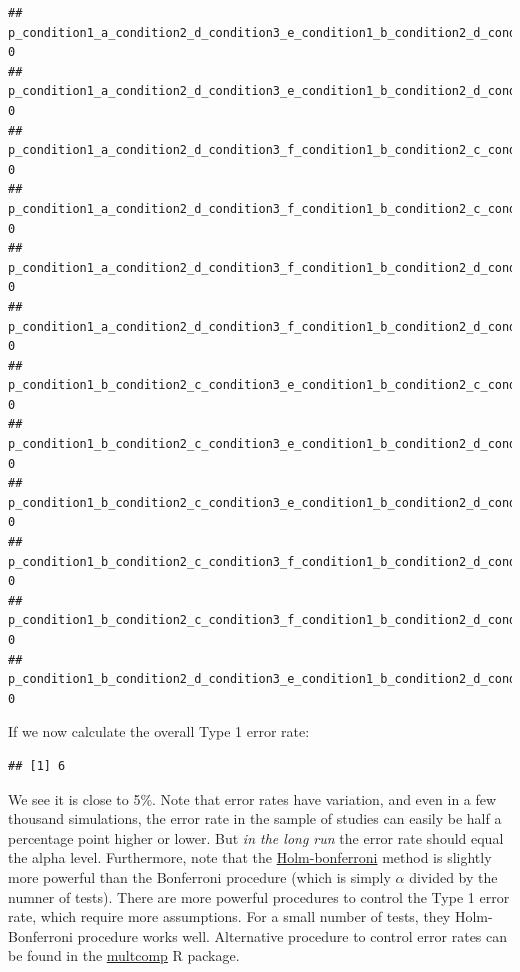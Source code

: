 \documentclass[]{book}
\newenvironment{Shaded}{\begin{snugshade}}{\end{snugshade}}
\newcommand{\ControlFlowTok}[1]{\textcolor[rgb]{0.13,0.29,0.53}{\textbf{#1}}}
\newcommand{\DecValTok}[1]{\textcolor[rgb]{0.00,0.00,0.81}{#1}}
\newcommand{\KeywordTok}[1]{\textcolor[rgb]{0.13,0.29,0.53}{\textbf{#1}}}
\newcommand{\NormalTok}[1]{#1}
\newcommand{\OperatorTok}[1]{\textcolor[rgb]{0.81,0.36,0.00}{\textbf{#1}}}
\newcommand{\StringTok}[1]{\textcolor[rgb]{0.31,0.60,0.02}{#1}}
\begin{document}
\begin{verbatim}
## p_condition1_a_condition2_d_condition3_e_condition1_b_condition2_d_condition3_e           0
## p_condition1_a_condition2_d_condition3_e_condition1_b_condition2_d_condition3_f           0
## p_condition1_a_condition2_d_condition3_f_condition1_b_condition2_c_condition3_e           0
## p_condition1_a_condition2_d_condition3_f_condition1_b_condition2_c_condition3_f           0
## p_condition1_a_condition2_d_condition3_f_condition1_b_condition2_d_condition3_e           0
## p_condition1_a_condition2_d_condition3_f_condition1_b_condition2_d_condition3_f           0
## p_condition1_b_condition2_c_condition3_e_condition1_b_condition2_c_condition3_f           0
## p_condition1_b_condition2_c_condition3_e_condition1_b_condition2_d_condition3_e           0
## p_condition1_b_condition2_c_condition3_e_condition1_b_condition2_d_condition3_f           0
## p_condition1_b_condition2_c_condition3_f_condition1_b_condition2_d_condition3_e           0
## p_condition1_b_condition2_c_condition3_f_condition1_b_condition2_d_condition3_f           0
## p_condition1_b_condition2_d_condition3_e_condition1_b_condition2_d_condition3_f           0
\end{verbatim}

If we now calculate the overall Type 1 error rate:

\begin{Shaded}
\end{Shaded}

\begin{verbatim}
## [1] 6
\end{verbatim}

We see it is close to 5\%. Note that error rates have variation, and even in a few thousand simulations, the error rate in the sample of studies can easily be half a percentage point higher or lower. But \emph{in the long run} the error rate should equal the alpha level. Furthermore, note that the \href{https://en.wikipedia.org/wiki/Holm\%E2\%80\%93Bonferroni_method}{Holm-bonferroni} method is slightly more powerful than the Bonferroni procedure (which is simply \(\alpha\) divided by the numner of tests). There are more powerful procedures to control the Type 1 error rate, which require more assumptions. For a small number of tests, they Holm-Bonferroni procedure works well. Alternative procedure to control error rates can be found in the \href{https://cran.r-project.org/web/packages/multcomp/index.html}{multcomp} R package.
\end{document}
